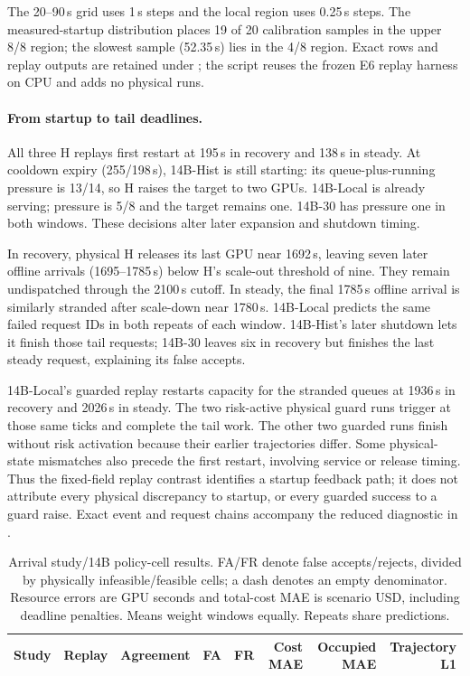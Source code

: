 The 20--90\,s grid uses 1\,s steps and the local region uses 0.25\,s
steps. The measured-startup distribution places 19 of 20 calibration samples
in the upper 8/8 region; the slowest sample (52.35\,s) lies in the 4/8
region. Exact rows and replay outputs are retained under
; the script reuses the frozen E6
replay harness on CPU and adds no physical runs.

\paragraph{From startup to tail deadlines.}
All three H replays first restart at 195\,s in recovery and 138\,s in steady.
At cooldown expiry (255/198\,s), 14B-Hist is still starting: its queue-plus-running
pressure is 13/14, so H raises the target to two GPUs. 14B-Local is already serving;
pressure is 5/8 and the target remains one. 14B-30 has pressure one in both
windows. These decisions alter later expansion and shutdown timing.

In recovery, physical H releases its last GPU near 1692\,s, leaving seven
later offline arrivals (1695--1785\,s) below H's scale-out threshold of nine.
They remain undispatched through the 2100\,s cutoff. In steady, the final
1785\,s offline arrival is similarly stranded after scale-down near 1780\,s.
14B-Local predicts the same failed request IDs in both repeats of each window.
14B-Hist's later shutdown lets it finish those tail requests; 14B-30 leaves six
in recovery but finishes the last steady request, explaining its false accepts.

14B-Local's guarded replay restarts capacity for the stranded queues at 1936\,s
in recovery and 2026\,s in steady. The two risk-active physical guard runs
trigger at those same ticks and complete the tail work. The other two guarded
runs finish without risk activation because their earlier trajectories differ.
Some physical-state mismatches also precede the first restart, involving
service or release timing. Thus the fixed-field replay contrast identifies
a startup feedback path; it does not attribute every physical discrepancy
to startup, or every guarded success to a guard raise. Exact event and request
chains accompany the reduced diagnostic in .

\begin{table}[t]
\centering
\small
\caption{Arrival study/14B policy-cell results. FA/FR denote false accepts/rejects, divided
by physically infeasible/feasible cells; a dash denotes an empty denominator.
Resource errors are GPU seconds and total-cost MAE is scenario USD, including
deadline penalties. Means weight windows equally. Repeats share predictions.}
\label{tab:e5e6}
\par\vspace{4pt}
\begin{tabular*}{\linewidth}{@{\extracolsep{\fill}}llrrrrrr@{}}
\toprule
Study & Replay & Agreement & FA & FR & Cost MAE & Occupied MAE & Trajectory L1\\
\midrule

\end{tabular*}
\end{table}


